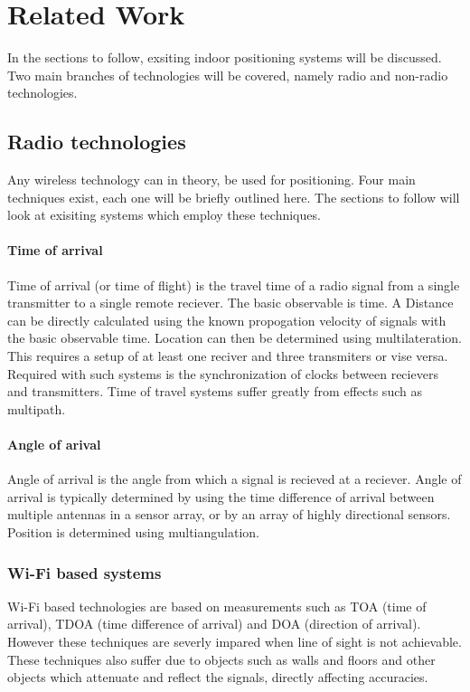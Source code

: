 \section{Related Work}
In the sections to follow, exsiting indoor positioning systems will be discussed. Two main branches of technologies will be covered, namely radio and non-radio technologies.

\subsection{Radio technologies}
Any wireless technology can in theory, be used for positioning. Four main techniques exist, each one will be briefly outlined here. The sections to follow will look at exisiting systems which employ these techniques.

\paragraph{Time of arrival}
Time of arrival (or time of flight) is the travel time of a radio signal from a single transmitter to a single remote reciever. The basic observable is time. A Distance can be directly calculated using the known propogation velocity of signals with the basic observable time. Location can then be determined using multilateration. This requires a setup of at least one reciver and three transmiters or vise versa.
Required with such systems is the synchronization of clocks between recievers and transmitters.
Time of travel systems suffer greatly from effects such as multipath.
\cite{k._pahlavan_wideband_1998}

\paragraph{Angle of arival}
Angle of arrival is the angle from which a signal is recieved at a reciever. Angle of arrival is typically determined by using the time difference of arrival between multiple antennas in a sensor array, or by an array of highly directional sensors. Position is determined using multiangulation.


\subsubsection{Wi-Fi based systems}
Wi-Fi based technologies are based on measurements such as TOA (time of arrival), TDOA (time difference of arrival) and DOA (direction of arrival). However these techniques are severly impared when line of sight is not achievable. These techniques also suffer due to objects such as walls and floors and other objects which attenuate and reflect the signals, directly affecting accuracies.

